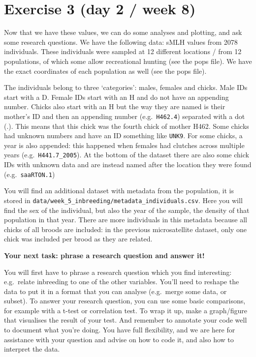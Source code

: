 \documentclass[
  letterpaper,
  DIV=11,
  numbers=noendperiod]{scrreprt}
\begin{document}
\section{Exercise 3 (day 2 / week 8)}\label{exercise-3-day-2-week-8}

Now that we have these values, we can do some analyses and plotting, and
ask some research questions. We have the following data: sMLH values
from 2078 individuals. These individuals were sampled at 12 different
locations / from 12 populations, of which some allow recreational
hunting (see the pops file). We have the exact coordinates of each
population as well (see the pops file).

The individuals belong to three `categories': males, females and chicks.
Male IDs start with a D. Female IDs start with an H and do not have an
appending number. Chicks also start with an H but the way they are named
is their mother's ID and then an appending number (e.g.~\texttt{H462.4})
separated with a dot (.). This means that this chick was the fourth
chick of mother H462. Some chicks had unknown numbers and have an ID
something like \texttt{UNK9}. For some chicks, a year is also appended:
this happened when females had clutches across multiple years
(e.g.~\texttt{H441.7\_2005}). At the bottom of the dataset there are
also some chick IDs with unknown data and are instead named after the
location they were found (e.g.~\texttt{saaRTON.1})

You will find an additional dataset with metadata from the population,
it is stored in
\texttt{data/week\_5\_inbreeding/metadata\_individuals.csv}. Here you
will find the sex of the individual, but also the year of the sample,
the density of that population in that year. There are more individuals
in this metadata because all chicks of all broods are included: in the
previous microsatellite dataset, only one chick was included per brood
as they are related.

\textbf{Your next task: phrase a research question and answer it!}

You will first have to phrase a research question which you find
interesting: e.g.~relate inbreeding to one of the other variables.
You'll need to reshape the data to put it in a format that you can
analyse (e.g.~merge some data, or subset). To answer your research
question, you can use some basic comparisons, for example with a t-test
or correlation test. To wrap it up, make a graph/figure that visualises
the result of your test. And remember to annotate your code well to
document what you're doing. You have full flexibility, and we are here
for assistance with your question and advise on how to code it, and also
how to interpret the data.
\end{document}
